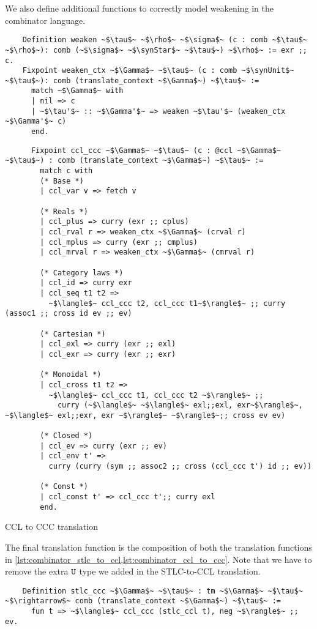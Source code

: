   We also define additional functions to correctly model weakening in the combinator language.

  \begin{verbatim}
    Definition weaken ~$\tau$~ ~$\rho$~ ~$\sigma$~ (c : comb ~$\tau$~ ~$\rho$~): comb (~$\sigma$~ ~$\synStar$~ ~$\tau$~) ~$\rho$~ := exr ;; c.
    Fixpoint weaken_ctx ~$\Gamma$~ ~$\tau$~ (c : comb ~$\synUnit$~ ~$\tau$~): comb (translate_context ~$\Gamma$~) ~$\tau$~ :=
      match ~$\Gamma$~ with
      | nil => c
      | ~$\tau'$~ :: ~$\Gamma'$~ => weaken ~$\tau'$~ (weaken_ctx ~$\Gamma'$~ c)
      end.
  \end{verbatim}

  \begin{listing}
    \begin{verbatim}
      Fixpoint ccl_ccc ~$\Gamma$~ ~$\tau$~ (c : @ccl ~$\Gamma$~ ~$\tau$~) : comb (translate_context ~$\Gamma$~) ~$\tau$~ :=
        match c with
        (* Base *)
        | ccl_var v => fetch v

        (* Reals *)
        | ccl_plus => curry (exr ;; cplus)
        | ccl_rval r => weaken_ctx ~$\Gamma$~ (crval r)
        | ccl_mplus => curry (exr ;; cmplus)
        | ccl_mrval r => weaken_ctx ~$\Gamma$~ (cmrval r)

        (* Category laws *)
        | ccl_id => curry exr
        | ccl_seq t1 t2 =>
          ~$\langle$~ ccl_ccc t2, ccl_ccc t1~$\rangle$~ ;; curry (assoc1 ;; cross id ev ;; ev)

        (* Cartesian *)
        | ccl_exl => curry (exr ;; exl)
        | ccl_exr => curry (exr ;; exr)

        (* Monoidal *)
        | ccl_cross t1 t2 =>
          ~$\langle$~ ccl_ccc t1, ccl_ccc t2 ~$\rangle$~ ;;
            curry (~$\langle$~ ~$\langle$~ exl;;exl, exr~$\rangle$~, ~$\langle$~ exl;;exr, exr ~$\rangle$~ ~$\rangle$~;; cross ev ev)

        (* Closed *)
        | ccl_ev => curry (exr ;; ev)
        | ccl_env t' =>
          curry (curry (sym ;; assoc2 ;; cross (ccl_ccc t') id ;; ev))

        (* Const *)
        | ccl_const t' => ccl_ccc t';; curry exl
        end.
    \end{verbatim}
    \caption{CCL to CCC translation}
    \label{lst:combinator_ccl_to_ccc}
  \end{listing}

  The final translation function is the composition of both the translation functions in \cref{lst:combinator_stlc_to_ccl,lst:combinator_ccl_to_ccc}.
  Note that we have to remove the extra $\texttt{U}$ type we added in the STLC-to-CCL translation.

  \begin{verbatim}
    Definition stlc_ccc ~$\Gamma$~ ~$\tau$~ : tm ~$\Gamma$~ ~$\tau$~ ~$\rightarrow$~ comb (translate_context ~$\Gamma$~) ~$\tau$~ :=
      fun t => ~$\langle$~ ccl_ccc (stlc_ccl t), neg ~$\rangle$~ ;; ev.
  \end{verbatim}
